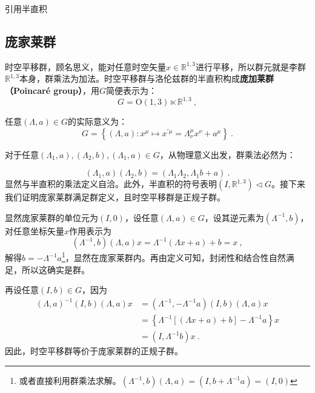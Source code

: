 

\begin{issues}
\issueTODO 引用半直积
\end{issues}


\subsection{庞家莱群}
时空平移群，顾名思义，能对任意时空矢量$x\in \mathbb R^{1,3} $进行平移，所以群元就是李群$\mathbb R^{1,3}$本身，群乘法为加法。时空平移群与洛伦兹群的半直积构成\textbf{庞加莱群（Poincaré group）}，用$G$简便表示为：
\begin{equation}
G= \mathrm{O}(1,3) \ltimes\mathbb{R}^{1,3}~,
\end{equation}

任意$(\Lambda,a)\in G$的实际意义为：
\begin{equation}
G=\left\{(\Lambda, a): x^{\mu} \mapsto x^{\prime \mu}=\Lambda_{\nu}^{\mu} x^{\nu}+a^{\mu}\right\}~.
\end{equation}


对于任意$(\Lambda_1,a),(\Lambda_2,b),(\Lambda_1,a)\in G$，从物理意义出发，群乘法必然为：

\begin{equation}
(\Lambda_1,a)(\Lambda_2,b)=(\Lambda_1\Lambda_2,\Lambda_1b+a)~.
\end{equation}
显然与半直积的乘法定义自洽。此外，半直积的符号表明$(I,\mathbb R^{1,3})\vartriangleleft G$。接下来我们证明庞家莱群满足群定义，且时空平移群是正规子群。

显然庞家莱群的单位元为$(I,0)$，设任意$(\Lambda,a)\in G$，设其逆元素为$(\Lambda^{-1},b)$，对任意坐标矢量$x$作用表示为
\begin{equation}
(\Lambda^{-1},b)(\Lambda,a)x=\Lambda^{-1}(\Lambda x+a)+b=x~,
\end{equation}
解得$b=-\Lambda^{-1} a$\footnote{或者直接利用群乘法求解。$(\Lambda^{-1},b)(\Lambda,a)=(I,b+\Lambda^{-1}a)=(I,0)$}，显然在庞家莱群内。再由定义可知，封闭性和结合性自然满足，所以这确实是群。

再设任意$(I,b)\in G$，因为
\begin{equation}
\begin{aligned}
(\Lambda,a)^{-1}(I,b)(\Lambda,a)x&=(\Lambda^{-1},-\Lambda^{-1}a)(I,b)(\Lambda,a)x\\
&=\left\{\Lambda^{-1}\left [\left(\Lambda x+a \right)+b\right]-\Lambda^{-1}a\right\}x\\
&=(I,\Lambda^{-1}b)x~.
\end{aligned}
\end{equation}
因此，时空平移群等价于庞家莱群的正规子群。

